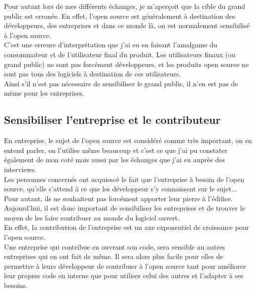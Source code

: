 		Pour autant lors de mes différents échanges, je m'aperçoit que la cible du grand public est erronée. En effet, l'open source est généralement à destination des développeurs, des entreprises et dans ce monde là, on est normalement sensibilisé à l'open source.\\

		C'est une erreure d'interprétation que j'ai eu en faisant l'amalgame du consommateur et de l'utilisateur final du produit. Les utilisateurs finaux (ou grand public) ne sont pas forcément développeurs, et les produits open source ne sont pas tous des logiciels à destination de ces utilisateurs.\\

		Ainsi s'il n'est pas nécessaire de sensibiliser le grand public, il n'en est pas de même pour les entreprises.

	\subsection{Sensibiliser l'entreprise et le contributeur}

		En entreprise, le sujet de l'open source est considéré comme très important, on en entend parler, on l'utilise même beaucoup et c'est ce que j'ai pu constater également de mon coté mais aussi par les échanges que j'ai eu auprès des interviews.\\

		Les personnes concernés ont acquiescé le fait que l'entreprise à besoin de l'open source, qu'elle s'attend à ce que les développeur s'y connaissent sur le sujet... Pour autant, ils ne souhaitent pas forcément apporter leur pierre à l'édifice.\\

		Aujourd'hui, il est donc important de sensibiliser les entreprises et de trouver le moyen de les faire contribuer au monde du logiciel ouvert.\\

		En effet, la contribution de l'entreprise est un axe exponentiel de croissance pour l'open source.\\

		Une entreprise qui contribue en ouvrant son code, sera sensible au autres entreprises qui en ont fait de même. Il sera alors plus facile pour elles de permettre à leurs développeur de contribuer à l'open source tant pour améliorer leur propres code en interne que pour utiliser celui des autres et l'adapter à ses besoins.\\

